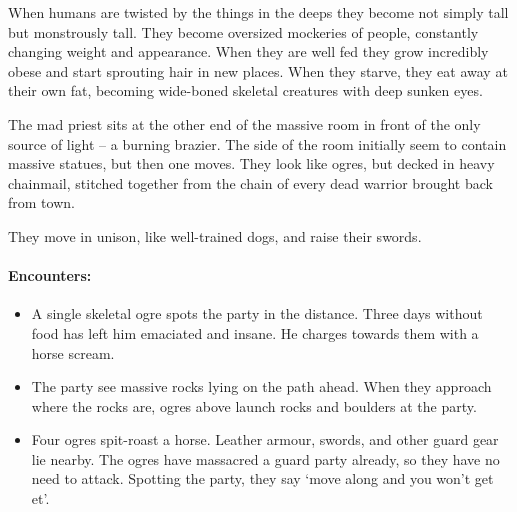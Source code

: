 \begin{multicols}{2}

\label{ogre}

When humans are twisted by the things in the deeps they become not simply tall but monstrously tall.
They become oversized mockeries of people, constantly changing weight and appearance.
When they are well fed they grow incredibly obese and start sprouting hair in new places.
When they starve, they eat away at their own fat, becoming wide-boned skeletal creatures with deep sunken eyes.


\begin{boxtext}

  The mad priest sits at the other end of the massive room in front of the only source of light -- a burning brazier.
  The side of the room initially seem to contain massive statues, but then one moves.
  They look like ogres, but decked in heavy chainmail, stitched together from the chain of every dead warrior brought back from town.

  They move in unison, like well-trained dogs, and raise their swords.

\end{boxtext}

\paragraph{Encounters:}

\begin{itemize}

  \item
  A single skeletal ogre spots the party in the distance.
  Three days without food has left him emaciated and insane.
  He charges towards them with a horse scream.
  \item
  The party see massive rocks lying on the path ahead.
  When they approach where the rocks are, ogres above launch rocks and boulders at the party.
  \item
  Four ogres spit-roast a horse.
  Leather armour, swords, and other \gls{guard} gear lie nearby.
  The ogres have massacred a \gls{guard} party already, so they have no need to attack.
  Spotting the party, they say `move along and you won't get et'.

\end{itemize}

\end{multicols}

